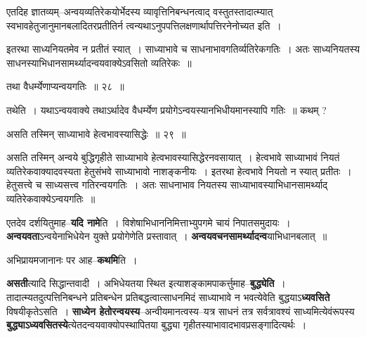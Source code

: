 \documentclass[article,12pt,a4paper]{memoir}
\begin{document}
	  \pstart एतदिह ज्ञातव्यम्--अन्वयव्यतिरेकयोर्भेदस्य व्यावृत्तिनिबन्धनत्वाद् वस्तुतस्तादात्म्यात् स्वभावहेतुजानुमानबलादितरप्रतीतिर्न त्वन्यथाऽनुपपत्तिलक्षणार्थापत्तिरनेनोच्यत इति ।
	\pend
	  \bigskip
	  \begingroup
	

	  \pstart इतरथा साध्यनियतमेव न प्रतीतं स्यात् । साध्याभावे च साधनाभावगतिर्व्यतिरेकगतिः । अतः साध्यनियतस्य साधनस्याभिधानसामर्थ्यादन्वयवाक्येऽवसितो व्यतिरेकः ॥
	\pend
        
	  \bigskip
	  \begingroup
	

	  \pstart तथा वैधर्म्येणाप्यन्वयगतिः ॥ २८ ॥
	\pend
      
	  \endgroup
	 

	  \pstart तथेति । यथाऽन्वयवाक्ये तथाऽर्थादेव वैधर्म्येण प्रयोगेऽन्वयस्यानभिधीयमानस्यापि गतिः ॥ कथम् ?
	\pend
        
	  \bigskip
	  \begingroup
	

	  \pstart असति तस्मिन् साध्याभावे हेत्वभावस्यासिद्धेः ॥ २९ ॥
	\pend
      
	  \endgroup
	 

	  \pstart असति तस्मिन् अन्वये बुद्धिगृहीते साध्याभावे हेत्वभावस्यासिद्धेरनवसायात् । हेत्वभावे साध्याभावं नियतं व्यतिरेकवाक्यादवस्यता हेतुसंभवे साध्याभावो नाशङ्कनीयः । इतरथा हेत्वभावे नियतो न स्यात् प्रतीतः । हेतुसत्त्वे च साध्यसत्त्व गतिरन्वयगतिः । अतः साधनाभाव नियतस्य साध्याभावस्याभिधानसामर्थ्याद् व्यतिरेकवाक्येऽन्वयगतिः ॥
	\pend
      
	  \endgroup
	

	  \pstart एतदेव दर्शयितुमाह--\textbf{यदि नामे}ति । विशेषाभिधाननिमित्ताभ्युपगमे चायं निपातसमुदायः । \textbf{अन्वयवता}ऽन्वयेनाभिधेयेन युक्ते प्रयोगेणेति प्रस्तावात् । \textbf{अन्वयवचनसामर्थ्यादन्व}\leavevmode{}याभिधानबलात् ॥
	\pend
      

	  \pstart अभिप्रायमजानानः पर आह--\textbf{कथमि}ति ।
	\pend
      

	  \pstart \textbf{असती}त्यादि सिद्धान्तवादी । अभिधेयतया स्थित इत्याशङ्कामपाकर्त्तुमाह--\textbf{बुद्ध्येति} । तादात्म्यतदुत्पत्तिनिबन्धने प्रतिबन्धेन प्रतिबद्धत्वात्साधनमिदं साध्याभावे न भवत्येवेति बुद्धयाऽ\textbf{ध्यवसिते} विषयीकृतेऽसति । \textbf{साध्येन हेतोरन्वयस्य}--अन्वीयमानत्वस्य--यत्र साधनं तत्र सर्वत्रावश्यं साध्यमित्येवंरूपस्य \textbf{बुद्ध्याऽध्यवसितस्ये}त्येतदन्वयवाक्योपस्थापितया बुद्ध्या गृहीतस्याभावादभावप्रसङ्गादित्यर्थः ।
	\pend
      
\end{document}
